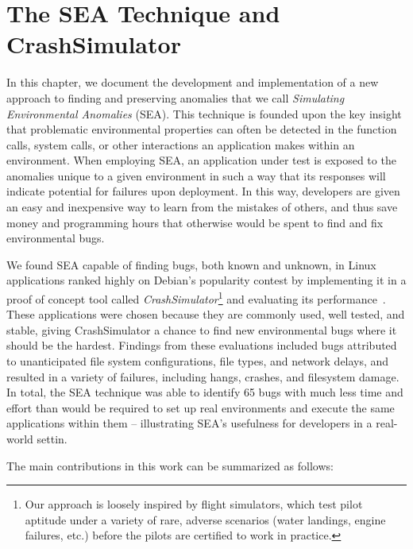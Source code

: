 \chapter{The SEA Technique and CrashSimulator}
\label{chap:sea}

In  this chapter, we document the development and implementation of a new
approach to finding and preserving anomalies that we call \textit{Simulating
Environmental Anomalies} (SEA). This technique is founded upon the key
insight that problematic environmental properties can often be detected
in the function calls, system
calls, or other interactions an application makes within an
environment. When employing SEA,
an application under test is exposed
to the anomalies unique to a given environment
in such a way that its responses will indicate
potential for failures upon deployment. In this way, developers are given
an easy and inexpensive way to learn from the mistakes of others, and
thus save money and programming hours that otherwise would be spent to
find and fix environmental bugs.

We found SEA capable of finding bugs,
both known and unknown,
in Linux applications ranked
highly on Debian's popularity contest
by implementing it in a proof of concept tool
called {\em CrashSimulator}\footnote{Our approach is
loosely inspired by flight simulators, which test pilot aptitude under a
variety of rare, adverse scenarios (water landings, engine failures,
etc.) before the pilots are certified to work in practice.}
and evaluating its performance~\cite{DebPopCon}.
These applications were chosen
because they are commonly used,
well tested,
and stable, giving CrashSimulator a chance to find new
environmental bugs where it should be the hardest.
Findings from these evaluations included bugs
attributed to
unanticipated file system configurations, file types, and network delays,
and resulted in a variety of failures, including hangs, crashes, and
filesystem damage.  In total, the SEA technique was able to identify 65
bugs with much less
time and effort than would be required to set up real environments and
execute the same applications within them -- illustrating SEA's
usefulness for developers in a real-world settin.

The main contributions in this work can be summarized as follows:

